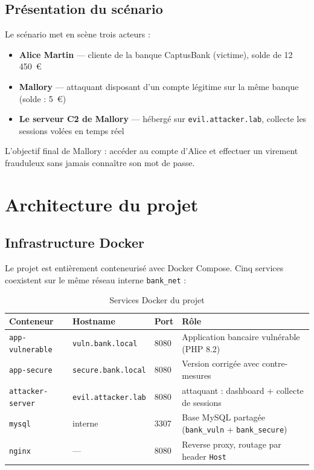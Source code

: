 \documentclass[12pt,a4paper]{report}
\newcommand{\http}[1]{\texttt{\small\textcolor{primary-blue}{#1}}}
\begin{document}
\section{Présentation du scénario}

Le scénario met en scène trois acteurs :

\begin{itemize}
  \item \textbf{Alice Martin} — cliente de la banque CaptusBank (victime), solde de 12\,450~€
  \item \textbf{Mallory} — attaquant disposant d'un compte légitime sur la même banque (solde : 5~€)
  \item \textbf{Le serveur C2 de Mallory} — hébergé sur \http{evil.attacker.lab}, collecte les sessions volées en temps réel
\end{itemize}

L'objectif final de Mallory : accéder au compte d'Alice et effectuer un virement frauduleux sans jamais connaître son mot de passe.

\chapter{Architecture du projet}

\section{Infrastructure Docker}

Le projet est entièrement conteneurisé avec Docker Compose. Cinq services coexistent sur le même réseau interne \texttt{bank\_net} :

\begin{table}[H]
\centering
\small
\begin{tabularx}{\linewidth}{@{}lllX@{}}
\toprule
\textbf{Conteneur} & \textbf{Hostname} & \textbf{Port} & \textbf{Rôle} \\
\midrule
\texttt{app-vulnerable} & \texttt{vuln.bank.local} & 8080 & Application bancaire vulnérable (PHP 8.2) \\
\texttt{app-secure} & \texttt{secure.bank.local} & 8080 & Version corrigée avec contre-mesures \\
\texttt{attacker-server} & \texttt{evil.attacker.lab} & 8080 & attaquant : dashboard + collecte de sessions \\
\texttt{mysql} & interne & 3307 & Base MySQL partagée (\texttt{bank\_vuln} + \texttt{bank\_secure}) \\
\texttt{nginx} & — & 8080 & Reverse proxy, routage par header \texttt{Host} \\
\bottomrule
\end{tabularx}
\caption{Services Docker du projet}
\end{table}
\end{document}
